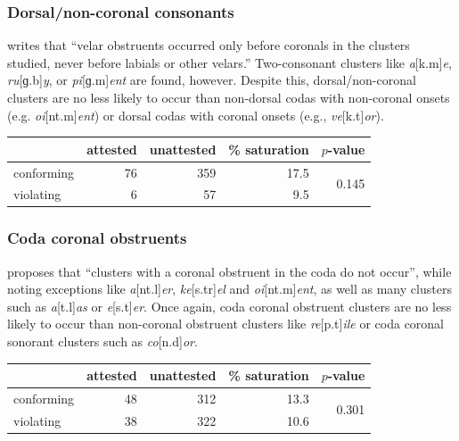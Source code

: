 \subsubsection{Dorsal/non-coronal consonants}

\citet[173]{Pierrehumbert1994} writes that ``velar obstruents occurred only before coronals in the clusters studied, never before labials or other velars.'' Two-consonant clusters like \emph{a}[k.m]\emph{e}, \emph{ru}[ɡ.b]\emph{y}, or \emph{pi}[ɡ.m]\emph{ent} are found, however. Despite this, dorsal/non-coronal clusters are no less likely to occur than non-dorsal codas with non-coronal onsets (e.g. \emph{oi}[nt.m]\emph{ent}) or dorsal codas with coronal onsets (e.g., \emph{ve}[k.t]\emph{or}).

\begin{example}
\begin{tabular}{l r r r r}
\toprule
           & attested & unattested & \% saturation & $p$-value \\
\midrule
conforming & 76 & 359 & 17.5 & \multirow{2}{*}{0.145} \\
violating  &  6 &  57 & 9.5 \\
\bottomrule
\end{tabular}
\end{example}

\subsubsection{Coda coronal obstruents}

\citet[175]{Pierrehumbert1994} proposes that ``clusters with a coronal obstruent in the coda do not occur'', while noting exceptions like \emph{a}[nt.l]\emph{er}, \emph{ke}[s.tr]\emph{el} and \emph{oi}[nt.m]\emph{ent}, as well as many clusters such as \emph{a}[t.l]\emph{as} or \emph{e}[s.t]\emph{er}. Once again, coda coronal obstruent clusters are no less likely to occur than non-coronal obstruent clusters like \emph{re}[p.t]\emph{ile} or coda coronal sonorant clusters such as \emph{co}[n.d]\emph{or}.

\begin{example}
\begin{tabular}{l r r r r}
\toprule
           & attested & unattested & \% saturation & $p$-value              \\
\midrule
conforming & 48       & 312        & 13.3      & \multirow{2}{*}{0.301} \\
violating  & 38       & 322        & 10.6                               \\
\bottomrule
\end{tabular}
\end{example}

